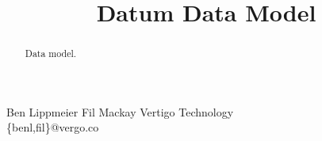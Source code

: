 \documentclass[preprint]{sigplanconf}
\begin{document}
\title  {Datum Data Model} 

\authorinfo
{       Ben Lippmeier \quad
        Fil Mackay  }
{ \shortstack
  {     Vertigo Technology\\[2pt]
        \textsf{\{benl,fil\}@vergo.co}
  }
}

\maketitle

\begin{abstract}
Data model.
\end{abstract}



% 

% 






\end{document}
